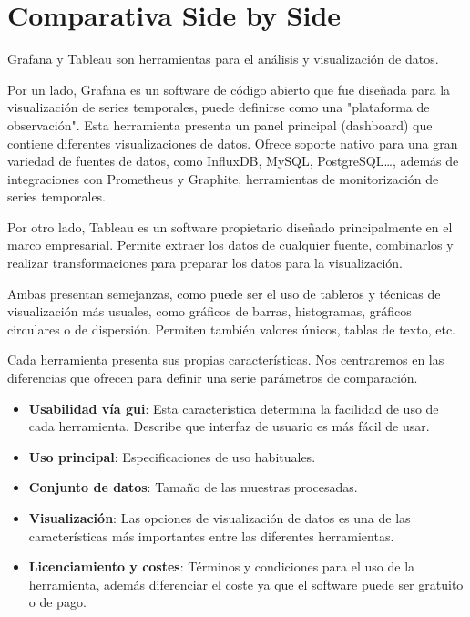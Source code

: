 \documentclass[a4paper, 12pt]{book}
\begin{document}
\section{Comparativa Side by Side}
\label{sec:comparativa}

Grafana y Tableau son herramientas para el análisis y visualización de datos. 

Por un lado, Grafana es un software de código abierto que fue diseñada para la visualización de series temporales, puede definirse como una "plataforma de observación". 
Esta herramienta presenta un panel principal (dashboard) que contiene diferentes visualizaciones de datos. Ofrece soporte nativo para una gran variedad de fuentes de datos, como InfluxDB, MySQL, PostgreSQL\ldots, además de integraciones con Prometheus y Graphite, herramientas de monitorización de series temporales. 

Por otro lado, Tableau es un software propietario diseñado principalmente en el marco empresarial. Permite extraer los datos de cualquier fuente, combinarlos y realizar transformaciones para preparar los datos para la visualización. 

Ambas presentan semejanzas, como puede ser el uso de tableros y técnicas de visualización más usuales, como gráficos de barras, histogramas, gráficos circulares o de dispersión. Permiten también valores únicos, tablas de texto, etc.   

Cada herramienta presenta sus propias características. %
Nos centraremos en las diferencias que ofrecen para definir una serie parámetros de comparación. 
\begin{itemize}
    \item \textbf{Usabilidad vía {\gls{gui}}}: Esta característica determina la facilidad de uso de cada herramienta. Describe que interfaz de usuario es más fácil de usar. 
    \item \textbf{Uso principal}: Especificaciones de uso habituales. 
    \item \textbf{Conjunto de datos}: Tamaño de las muestras procesadas.
    \item \textbf{Visualización}: Las opciones de visualización de datos es una de las características más importantes entre las diferentes herramientas. 
    \item \textbf{Licenciamiento y costes}: Términos y condiciones para el uso de la herramienta, además diferenciar el coste ya que el software puede ser gratuito o de pago. 
\end{itemize}
\end{document}
